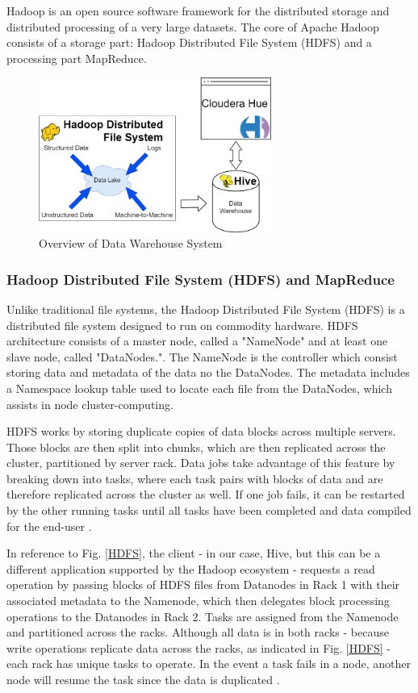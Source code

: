 \documentclass[journal]{IEEEtran}
\begin{document}
Hadoop is an open source software framework for the distributed storage and
 distributed processing of a very large datasets. 
The core of Apache Hadoop consists of a storage part: Hadoop Distributed File System
 (HDFS) and a processing part MapReduce.

\begin{figure}
	\centering
	\includegraphics[width=3in]{system_overview_final.png}
	\caption{Overview of Data Warehouse System}
	\label{system_overview_final}
\end{figure}

\subsubsection{Hadoop Distributed File System (HDFS) and  MapReduce}

Unlike traditional file systems, the Hadoop Distributed File System (HDFS) is a distributed file system designed to run on commodity hardware. 
HDFS architecture consists of a master node, called a "NameNode" and at least one slave node, called "DataNodes."\cite{HDFSarchitecture}.
The NameNode is the controller which consist storing data and metadata of the data no the DataNodes. 
The metadata includes a Namespace lookup table used to locate each file from the DataNodes, which assists in node cluster-computing. 

HDFS works by storing duplicate copies of data blocks across multiple servers. Those blocks are then split into chunks, which are then 
replicated across the cluster, partitioned by server rack. Data jobs take advantage of this feature by breaking down into tasks, 
where each task pairs with blocks of data and are therefore replicated across the cluster as well. If one job fails, it can be restarted 
by the other running tasks until all tasks have been completed and data compiled for the end-user \cite{HadoopAdmin}.

In reference to Fig. \ref{HDFS}, the client - in our case, Hive, but this can be a different application supported by the Hadoop ecosystem - requests a 
read operation by passing blocks of HDFS files from Datanodes in Rack 1 with their associated metadata to the Namenode, which then delegates
block processing operations to the Datanodes in Rack 2. Tasks are assigned from the Namenode and partitioned across the racks. 
Although all data is in both racks - because write operations replicate data across the racks, as indicated in Fig. \ref{HDFS} - each rack has unique tasks
to operate. In the event a task fails in a node, another node will resume the task since the data is duplicated \cite{HadoopAdmin}. 
\end{document}
